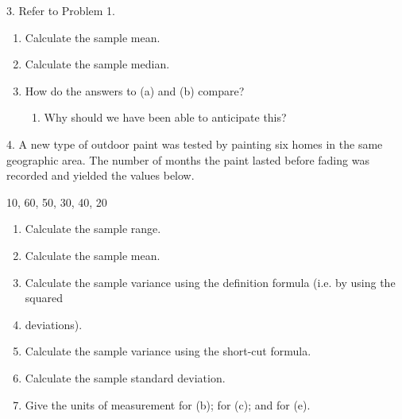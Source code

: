 \documentclass{report}
\begin{document}
    \pagebreak 
    \begin{mdframed}
        3. Refer to Problem 1.
        \begin{enumerate}[label=(\alph*)]
            \item  Calculate the sample mean. 
            \item Calculate the sample median. 
            \item How do the answers to (a) and (b) compare? 
                \begin{enumerate}[label=(\roman*)]
                    \item Why should we have been able to anticipate this?  
                \end{enumerate}
        \end{enumerate}
    \end{mdframed}

    \pagebreak 
    \begin{mdframed}
        4. A new type of outdoor paint was tested by painting six homes in the same geographic
        area. The number of months the paint lasted before fading was recorded and yielded the values
        below.
        \bigbreak \noindent 
        \begin{center}
            10, 60, 50, 30, 40, 20
        \end{center}
        \begin{enumerate}[label=(\alph*)]
            \item Calculate the sample range. 
            \item Calculate the sample mean. 
            \item Calculate the sample variance using the definition formula (i.e. by using the squared
            \item deviations). 
            \item Calculate the sample variance using the short-cut formula. 
            \item Calculate the sample standard deviation. 
            \item Give the units of measurement for (b); for (c); and for (e). 
        \end{enumerate}
    \end{mdframed}
\end{document}
